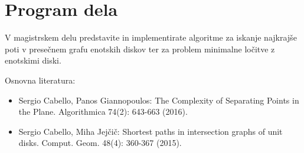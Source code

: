 \documentclass[a4paper, 12pt]{book}
\newcommand{\clearemptydoublepage}{\newpage{\pagestyle{empty}\cleardoublepage}}
\begin{document}
%
%   
%
%
%
%

\thispagestyle{empty}\mbox{}\vfill\null\it%
 
\rm\normalfont

\clearemptydoublepage


\tableofcontents{}

\clearemptydoublepage
\def\thepage{}
\chapter*{Program dela}
V magistrskem delu predstavite in implementirate algoritme za iskanje najkrajše poti v presečnem grafu enotskih diskov ter za problem minimalne ločitve z enotskimi diski.

Osnovna literatura:
\begin{itemize}
        \item Sergio Cabello, Panos Giannopoulos:
                The Complexity of Separating Points in the Plane.
                Algorithmica 74(2): 643-663 (2016).
        \item Sergio Cabello, Miha Jejčič:
                Shortest paths in intersection graphs of unit disks.
                Comput. Geom. 48(4): 360-367 (2015).
\end{itemize}
\end{document}
